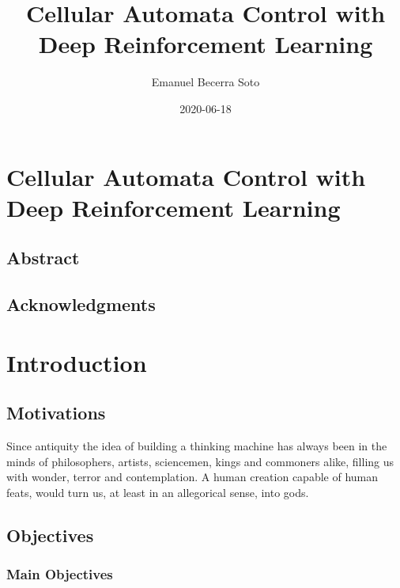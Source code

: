 \documentclass[
]{book}
\title{Cellular Automata Control with Deep Reinforcement Learning}
\author{Emanuel Becerra Soto}
\date{2020-06-18}
\begin{document}
\maketitle

{
\setcounter{tocdepth}{1}
\tableofcontents
}
\hypertarget{cellular-automata-control-with-deep-reinforcement-learning}{%
\chapter{Cellular Automata Control with Deep Reinforcement Learning}\label{cellular-automata-control-with-deep-reinforcement-learning}}

\hypertarget{abstract}{%
\section{Abstract}\label{abstract}}

\hypertarget{acknowledgments}{%
\section{Acknowledgments}\label{acknowledgments}}

\hypertarget{introduction}{%
\chapter{Introduction}\label{introduction}}

\hypertarget{motivations}{%
\section{Motivations}\label{motivations}}

Since antiquity the idea of building a thinking machine has always been in the minds of philosophers, artists, sciencemen, kings and commoners alike, filling us with wonder, terror and contemplation. A human creation capable of human feats, would turn us, at least in an allegorical sense, into gods.

\hypertarget{objectives}{%
\section{Objectives}\label{objectives}}

\hypertarget{main-objectives}{%
\subsection{Main Objectives}\label{main-objectives}}
\end{document}
